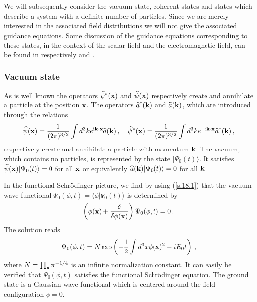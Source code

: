 \documentclass[12pt]{article}
\def\la{\langle}
\def\ra{\rangle}
\def\ii{\textrm i}
\begin{document}
We will subsequently consider the vacuum state, coherent states and states which describe a system with a definite number of particles. Since we are merely interested in the associated field distributions we will not give the associated guidance equations. Some discussion of the guidance equations corresponding to these states, in the context of the scalar field and the electromagnetic field, can be found in respectively \cite{bohm87b,bohm93,holland93b,holland93a,lam941,lam942} and \cite{kaloyerou94}.

\subsubsection{Vacuum state}
As is well known the operators ${\widehat \psi^*}({\bf x})$ and ${\widehat \psi}({\bf x})$ respectively create and annihilate a particle at the position ${\bf x}$. The operators ${\widehat a}^\dagger({\bf k})$ and ${\widehat a}({\bf k})$, which are introduced through the relations
\begin{equation}
{\widehat \psi}({\bf x}) = \frac{1}{(2\pi)^{3/2}} \int d^3 k e^{\ii {\bf k} \cdot {\bf x}}{\widehat a}({\bf k}) \,,\quad {\widehat \psi^*}({\bf x}) = \frac{1}{(2\pi)^{3/2}} \int d^3 k e^{-\ii {\bf k} \cdot {\bf x}}{\widehat a}^\dagger({\bf k})\,,
\label{s.19}
\end{equation}
respectively create and annihilate a particle with momentum ${\bf k}$. The vacuum, which contains no particles, is represented by the state $|\Psi_0(t)\ra$. It satisfies ${\widehat \psi}({\bf x})|\Psi_0(t)\ra=0 $ for all ${\bf x}$ or equivalently ${\widehat a}({\bf k}) |\Psi_0(t)\ra=0 $ for all ${\bf k}$. 

In the functional Schr{\"o}\-ding\-er picture, we find by using ({\ref{s.18.1}}) that the vacuum wave functional $\Psi_0(\phi,t)=\la \phi |\Psi_0(t) \ra$ is determined by
\begin{equation}
\left( \phi({\bf x}) + \frac{\delta }{\delta \phi({\bf x})} \right)\Psi_0(\phi,t) = 0\,.
\label{s.20}
\end{equation}
The solution reads
\begin{equation}
\Psi_0(\phi,t)=N \exp  \left(-\frac{1}{2} \int d^3x \phi({\bf x})^2 - iE_0 t \right)\,,
\label{s.21}
\end{equation}
where $N=\prod_{\bf x} \pi^{-1/4}$ is an infinite normalization constant. It can easily be verified that $\Psi_0(\phi,t)$ satisfies the functional Schr{\"o}\-ding\-er equation. The ground state is a Gaussian wave functional which is centered around the field configuration $\phi=0$. 
\end{document}
